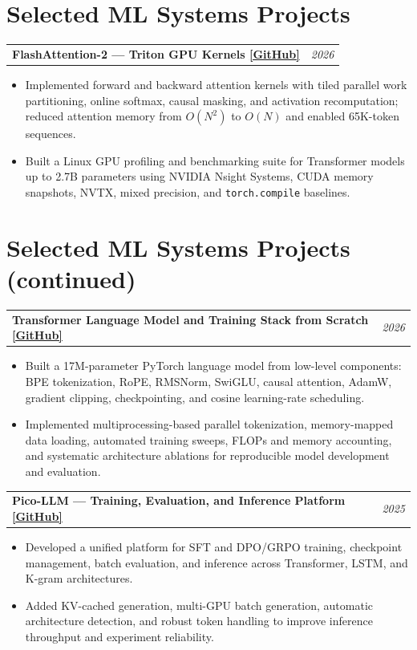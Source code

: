 \documentclass[10pt,letterpaper]{article}
\makeatletter
\newcommand{\project}[2]{%
  \begin{tabularx}{\textwidth}{@{}Xr@{}}
    \textbf{#1} & \textit{#2}
  \end{tabularx}\vspace{-0.25em}
}
\makeatother
\begin{document}
\section{Selected ML Systems Projects}

\project{FlashAttention-2 --- Triton GPU Kernels \href{https://github.com/k-keshav-k/Flash-Attention}{[GitHub]}}{2026}
\begin{itemize}
  \item Implemented forward and backward attention kernels with tiled parallel work partitioning, online softmax, causal masking, and activation recomputation; reduced attention memory from $O(N^2)$ to $O(N)$ and enabled 65K-token sequences.
  \item Built a Linux GPU profiling and benchmarking suite for Transformer models up to 2.7B parameters using NVIDIA Nsight Systems, CUDA memory snapshots, NVTX, mixed precision, and \texttt{torch.compile} baselines.
\end{itemize}

\newpage
\section{Selected ML Systems Projects (continued)}

\project{Transformer Language Model and Training Stack from Scratch \href{https://github.com/k-keshav-k/Large-Language-Models-from-Scratch}{[GitHub]}}{2026}
\begin{itemize}
  \item Built a 17M-parameter PyTorch language model from low-level components: BPE tokenization, RoPE, RMSNorm, SwiGLU, causal attention, AdamW, gradient clipping, checkpointing, and cosine learning-rate scheduling.
  \item Implemented multiprocessing-based parallel tokenization, memory-mapped data loading, automated training sweeps, FLOPs and memory accounting, and systematic architecture ablations for reproducible model development and evaluation.
\end{itemize}

\vspace{0.55em}
\project{Pico-LLM --- Training, Evaluation, and Inference Platform \href{https://github.com/k-keshav-k/pico-llm}{[GitHub]}}{2025}
\begin{itemize}
  \item Developed a unified platform for SFT and DPO/GRPO training, checkpoint management, batch evaluation, and inference across Transformer, LSTM, and K-gram architectures.
  \item Added KV-cached generation, multi-GPU batch generation, automatic architecture detection, and robust token handling to improve inference throughput and experiment reliability.
\end{itemize}
\end{document}
